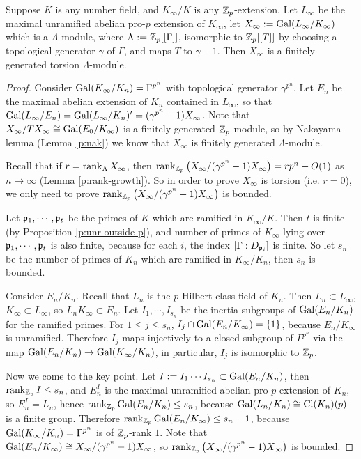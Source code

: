 \begin{thm}[Iwasawa]\label{p:f-g-torsion2}
Suppose $K$ is any number field, and $K_\infty/K$ is any ${\mathbb {Z}}_p$-extension.
Let $L_\infty$ be the maximal unramified abelian pro-$p$ extension of $K_\infty$,
let $X_\infty:={\mathrm{Gal}}(L_\infty/K_\infty)$ which is a $\Lambda$-module,
where $\Lambda:={\mathbb {Z}}_p[[\Gamma]]$, isomorphic to ${\mathbb {Z}}_p[[T]]$
by choosing a topological generator $\gamma$ of $\Gamma$,
and maps $T$ to $\gamma-1$. Then $X_\infty$ is a finitely generated torsion
$\Lambda$-module.
\end{thm}

\begin{proof}
Consider ${\mathrm{Gal}}(K_\infty/K_n)=\Gamma^{p^n}$ with topological generator
$\gamma^{p^n}$. Let $E_n$ be the maximal abelian extension of $K_n$
contained in $L_\infty$, so that ${\mathrm{Gal}}(L_\infty/E_n)={\mathrm{Gal}}(L_\infty/K_n)'
=(\gamma^{p^n}-1)X_\infty$. Note that $X_\infty/TX_\infty\cong{\mathrm{Gal}}(E_0/K_\infty)$
is a finitely generated ${\mathbb {Z}}_p$-module, so by Nakayama lemma
(Lemma \ref{p:nak}) we know that $X_\infty$ is finitely generated $\Lambda$-module.

Recall that if $r=\operatorname{rank}_\Lambda X_\infty$, then
$\operatorname{rank}_{{\mathbb {Z}}_p}\left(X_\infty/(\gamma^{p^n}-1)X_\infty\right)=rp^n+O(1)$
as $n\to\infty$ (Lemma \ref{p:rank-growth}). So in order to prove
$X_\infty$ is torsion (i.e. $r=0$), we only need to prove
$\operatorname{rank}_{{\mathbb {Z}}_p}\left(X_\infty/(\gamma^{p^n}-1)X_\infty\right)$ is bounded.

Let ${\mathfrak{p}}_1,\cdots,{\mathfrak{p}}_t$ be the primes of $K$ which are ramified in $K_\infty/K$.
Then $t$ is finite (by Proposition \ref{p:unr-outside-p}),
and number of primes of $K_\infty$ lying over ${\mathfrak{p}}_1,\cdots,{\mathfrak{p}}_t$
is also finite, because for each $i$, the index $[\Gamma:D_{{\mathfrak{p}}_i}]$
is finite. So let $s_n$ be the number of primes of $K_n$ which are
ramified in $K_\infty/K_n$, then $s_n$ is bounded.

Consider $E_n/K_n$. Recall that $L_n$ is the $p$-Hilbert class field
of $K_n$. Then $L_n\subset L_\infty$, $K_\infty\subset L_\infty$,
so $L_nK_\infty\subset E_n$. Let $I_1,\cdots,I_{s_n}$ be the inertia
subgroups of ${\mathrm{Gal}}(E_n/K_n)$ for the ramified primes.
For $1\leq j\leq s_n$, $I_j\cap{\mathrm{Gal}}(E_n/K_\infty)=\{1\}$,
because $E_n/K_\infty$ is unramified. Therefore $I_j$ maps injectively
to a closed subgroup of $\Gamma^{p^n}$
via the map ${\mathrm{Gal}}(E_n/K_n)\to{\mathrm{Gal}}(K_\infty/K_n)$,
in particular, $I_j$ is isomorphic to ${\mathbb {Z}}_p$.

Now we come to the key point. Let $I:=I_1\cdots I_{s_n}\subset{\mathrm{Gal}}(E_n/K_n)$,
then $\operatorname{rank}_{{\mathbb {Z}}_p}I\leq s_n$, and $E_n^I$ is the maximal
unramified abelian pro-$p$ extension of $K_n$, so $E_n^I=L_n$,
hence $\operatorname{rank}_{{\mathbb {Z}}_p}{\mathrm{Gal}}(E_n/K_n)\leq s_n$,
because ${\mathrm{Gal}}(L_n/K_n)\cong{\mathrm{Cl}}(K_n)(p)$ is a finite group.
Therefore $\operatorname{rank}_{{\mathbb {Z}}_p}{\mathrm{Gal}}(E_n/K_\infty)\leq s_n-1$,
because ${\mathrm{Gal}}(K_\infty/K_n)=\Gamma^{p^n}$ is of ${\mathbb {Z}}_p$-rank $1$.
Note that ${\mathrm{Gal}}(E_n/K_\infty)\cong X_\infty/(\gamma^{p^n}-1)X_\infty$,
so $\operatorname{rank}_{{\mathbb {Z}}_p}\left(X_\infty/(\gamma^{p^n}-1)X_\infty\right)$ is bounded.
\end{proof}

